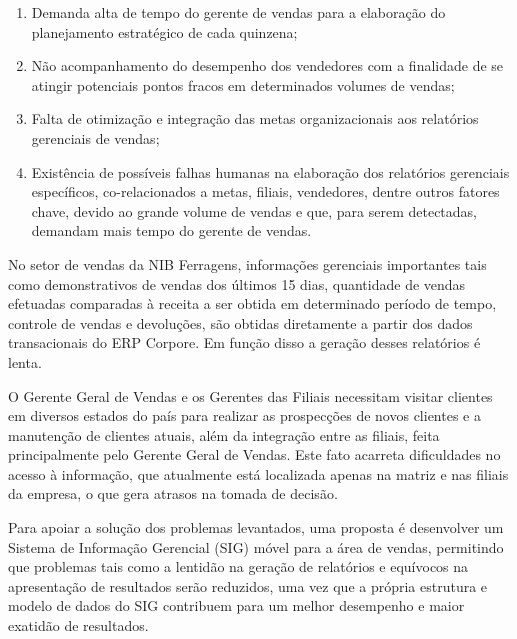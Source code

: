 \documentclass[a4paper]{article}
\newcommand\liststyleWWviiiNumxxxviii{%
\renewcommand\theenumi{\alph{enumi}}
\renewcommand\theenumii{\alph{enumii}}
\renewcommand\theenumiii{\roman{enumiii}}
\renewcommand\theenumiv{\arabic{enumiv}}
\renewcommand\labelenumi{\theenumi)}
\renewcommand\labelenumii{\theenumii.}
\renewcommand\labelenumiii{\theenumiii.}
\renewcommand\labelenumiv{\theenumiv.}
}
\begin{document}
\liststyleWWviiiNumxxxviii
\begin{enumerate}
\item {
\textsf{Demanda alta de tempo do gerente de vendas para a elabora\c{c}\~ao do planejamento estrat\'egico de cada
quinzena;}}
\item {
\textsf{N\~ao acompanhamento do desempenho dos vendedores com a finalidade de se atingir potenciais pontos fracos em
determinados volumes de vendas;}}
\item {\sffamily
Falta de otimiza\c{c}\~ao e integra\c{c}\~ao das metas organizacionais aos relat\'orios gerenciais de vendas;}
\item {
\textsf{Exist\^encia de poss\'iveis falhas humanas na elabora\c{c}\~ao dos relat\'orios gerenciais espec\'ificos,
co-relacionados a metas, filiais, vendedores, dentre outros fatores chave, devido ao grande volume de vendas e que,
para serem detectadas, demandam mais tempo do gerente de vendas.}}
\end{enumerate}
{
\textsf{No setor de vendas da NIB Ferragens, informa\c{c}\~oes gerenciais importantes tais como demonstrativos de vendas
dos \'ultimos 15 dias, quantidade de vendas efetuadas }\textsf{comparadas \`a receita a ser obtida em determinado
per\'iodo de tempo, controle de vendas e devolu\c{c}\~oes, s\~ao obtidas diretamente a partir dos dados transacionais
do ERP Corpore. Em fun\c{c}\~ao disso a gera\c{c}\~ao desses relat\'orios \'e lenta.}}

{
\textsf{O Gerente Geral de Vendas e os Gerentes das Filiais necessitam visitar clientes em diversos estados do pa\'is
para realizar as prospec\c{c}\~oes de novos clientes e a manuten\c{c}\~ao de clientes atuais, al\'em da
integra\c{c}\~ao entre as filiais, feita principalmente pelo Gerente Geral de Vendas. Este fato acarreta dificuldades
no acesso \`a informa\c{c}\~ao, que atualmente est\'a localizada apenas na matriz e nas filiais da empresa, o que gera
atrasos na tomada de decis\~ao.}}

{
\textsf{Para apoiar a solu\c{c}\~ao dos problemas levantados, uma proposta \'e desenvolver um Sistema de
Informa\c{c}\~ao Gerencial (SIG) m\'ovel para a \'area de vendas, permitindo que problemas tais como a lentid\~ao na
gera\c{c}\~ao de relat\'orios e equ\'ivocos na apresenta\c{c}\~ao de resultados ser\~ao reduzidos, uma vez que a
pr\'opria estrutura e modelo de dados do SIG contribuem para um melhor desempenho e maior exatid\~ao de resultados.}}
\end{document}
